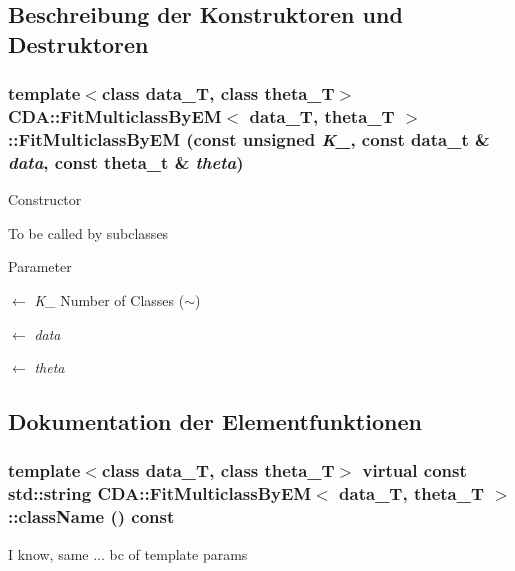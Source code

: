 \subsection{Beschreibung der Konstruktoren und Destruktoren}
\hypertarget{classCDA_1_1FitMulticlassByEM_a42ba3e452dfee55767219ab9571b0dd5}{
\subsubsection[{FitMulticlassByEM}]{\setlength{\rightskip}{0pt plus 5cm}template$<$class data\_\-T, class theta\_\-T$>$ {\bf CDA::FitMulticlassByEM}$<$ data\_\-T, theta\_\-T $>$::{\bf FitMulticlassByEM} (const unsigned {\em K\_\-}, \/  const {\bf data\_\-t} \& {\em data}, \/  const theta\_\-t \& {\em theta})}}
\label{classCDA_1_1FitMulticlassByEM_a42ba3e452dfee55767219ab9571b0dd5}
Constructor

To be called by subclasses


\begin{DoxyParams}{Parameter}
\item[\mbox{$\leftarrow$} {\em K\_\-}]Number of Classes ($\sim$) \item[\mbox{$\leftarrow$} {\em data}]\item[\mbox{$\leftarrow$} {\em theta}]\end{DoxyParams}


\subsection{Dokumentation der Elementfunktionen}
\hypertarget{classCDA_1_1FitMulticlassByEM_a885947f2c93b4a05cb3eb153d774cb75}{
\subsubsection[{className}]{\setlength{\rightskip}{0pt plus 5cm}template$<$class data\_\-T, class theta\_\-T$>$ virtual const std::string {\bf CDA::FitMulticlassByEM}$<$ data\_\-T, theta\_\-T $>$::className () const}}
\label{classCDA_1_1FitMulticlassByEM_a885947f2c93b4a05cb3eb153d774cb75}
I know, same ... bc of template params 

